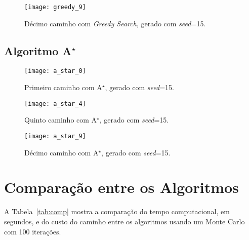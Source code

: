 \documentclass[brazil, 12pt]{article}
\begin{document}
\begin{figure}[H]
	\centering
	\texttt{[image: greedy\_9]} %
	\caption{Décimo caminho com \textit{Greedy Search}, gerado com \textit{seed}=15.} %
	\label{fig:greedy_9}  %
\end{figure}

\subsection{Algoritmo A$^{\star}$}
\begin{figure}[H]
	\centering
	\texttt{[image: a\_star\_0]} %
	\caption{Primeiro caminho com A$^{\star}$, gerado com \textit{seed}=15.} %
	\label{fig:a_star_0}  %
\end{figure}

\begin{figure}[H]
	\centering
	\texttt{[image: a\_star\_4]} %
	\caption{Quinto caminho com A$^{\star}$, gerado com \textit{seed}=15.} %
	\label{fig:a_star_4}  %
\end{figure}

\begin{figure}[H]
	\centering
	\texttt{[image: a\_star\_9]} %
	\caption{Décimo caminho com A$^{\star}$, gerado com \textit{seed}=15.} %
	\label{fig:a_star_9}  %
\end{figure}


\section{Comparação entre os Algoritmos}

A Tabela~\ref{tab:comp} mostra a comparação do tempo computacional, em segundos, e do custo do caminho entre os algoritmos usando um Monte Carlo com 100 iterações.
\end{document}
